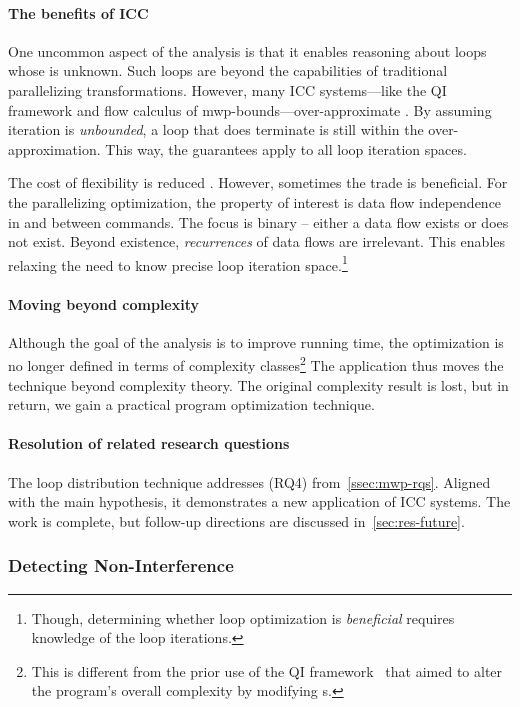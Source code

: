 \paragraph*{The benefits of ICC}
One uncommon aspect of the analysis is that it enables reasoning about loops whose
 is unknown. Such loops are beyond the capabilities of
traditional parallelizing transformations. However, many ICC systems---like the
QI framework and flow calculus of mwp-bounds---over-approximate . By assuming iteration is \emph{unbounded}, a loop that does
terminate is still within the over-approximation.
This way, the guarantees apply to all loop iteration spaces.

The cost of flexibility is reduced . However, sometimes the trade
is beneficial. For the parallelizing optimization, the property of interest is
data flow independence in and between commands. The focus is binary -- either a
data flow exists or does not exist. Beyond existence, \emph{recurrences} of data
flows are irrelevant. This enables relaxing the need to know precise loop
iteration space.\footnote{Though, determining whether loop optimization is
\emph{beneficial} requires knowledge of the loop iterations.}

\paragraph*{Moving beyond complexity}
Although the goal of the analysis is to improve running time, the optimization
is no longer defined in terms of complexity classes\footnote{This is different
from the prior use of the QI framework~\cite{moyen20172} that aimed to alter the
program's overall complexity by modifying s.} The application
thus moves the technique beyond complexity theory. The original complexity
result is lost, but in return, we gain a practical program optimization
technique.

\paragraph*{Resolution of related research questions}
The loop distribution technique addresses (RQ4) from~\autoref{ssec:mwp-rqs}.
Aligned with the main hypothesis, it demonstrates a new application of ICC
systems. The work is complete, but follow-up directions are discussed
in~\autoref{sec:res-future}.

\subsubsection{Detecting Non-Interference}
\label{subsubsec:qi-ni}

